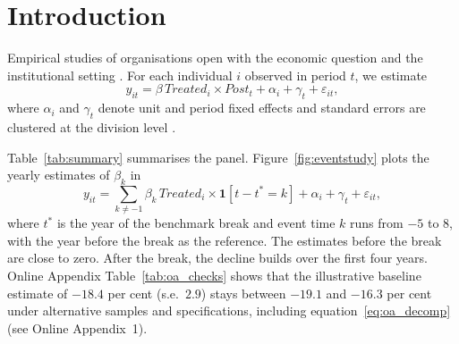 \section{Introduction}\label{sec:intro}

Empirical studies of organisations open with the economic question and the institutional setting \citep{becker1957, alchian1972}. For each individual \(i\) observed in period \(t\), we estimate
\begin{equation}
  y_{it} = \beta \, \mathit{Treated}_{i} \times \mathit{Post}_{t} + \alpha_{i} + \gamma_{t} + \varepsilon_{it},
  \label{eq:baseline}
\end{equation}
where \(\alpha_{i}\) and \(\gamma_{t}\) denote unit and period fixed effects and standard errors are clustered at the division level \citep{bertrand2004}.

Table~\ref{tab:summary} summarises the panel. Figure~\ref{fig:eventstudy} plots the yearly estimates of \(\beta_{k}\) in
\begin{equation}
  y_{it} = \sum_{k \neq -1} \beta_{k} \, \mathit{Treated}_{i} \times \mathbf{1}[t - t^{*} = k] + \alpha_{i} + \gamma_{t} + \varepsilon_{it},
  \label{eq:eventstudy}
\end{equation}
where \(t^{*}\) is the year of the benchmark break and event time \(k\) runs from \(-5\) to \(8\), with the year before the break as the reference. The estimates before the break are close to zero. After the break, the decline builds over the first four years. Online Appendix Table~\ref{tab:oa_checks} shows that the illustrative baseline estimate of \(-18.4\) per cent (s.e.\ \(2.9\)) stays between \(-19.1\) and \(-16.3\) per cent under alternative samples and specifications, including equation~\eqref{eq:oa_decomp} (see Online Appendix~1).



